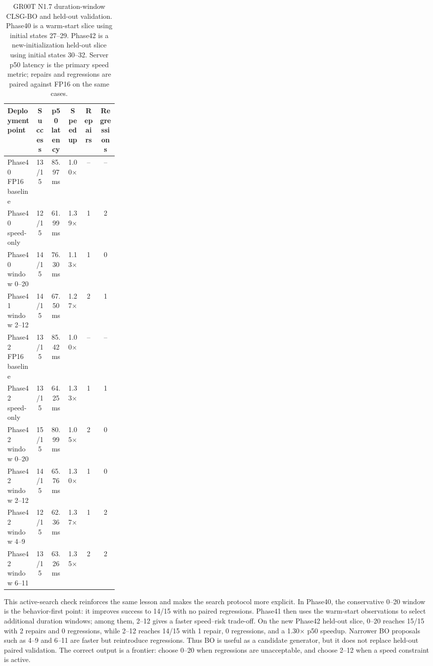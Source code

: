 \documentclass[10pt]{article}
\begin{document}
\begin{table}[H]
\centering
\scriptsize
\setlength{\tabcolsep}{3pt}
\caption{GR00T N1.7 duration-window CLSG-BO and held-out validation. Phase40 is a warm-start slice using initial states 27--29. Phase42 is a new-initialization held-out slice using initial states 30--32. Server p50 latency is the primary speed metric; repairs and regressions are paired against FP16 on the same cases.}
\label{tab:n17-clsg-bo}
\begin{tabular}{p{0.26\linewidth}ccccc}
\toprule
Deployment point & Success & p50 latency & Speedup & Repairs & Regressions \\
\midrule
Phase40 FP16 baseline & 13/15 & 85.97 ms & 1.00$\times$ & -- & -- \\
Phase40 speed-only & 12/15 & 61.99 ms & 1.39$\times$ & 1 & 2 \\
Phase40 window 0--20 & 14/15 & 76.30 ms & 1.13$\times$ & 1 & 0 \\
Phase41 window 2--12 & 14/15 & 67.50 ms & 1.27$\times$ & 2 & 1 \\
\midrule
Phase42 FP16 baseline & 13/15 & 85.42 ms & 1.00$\times$ & -- & -- \\
Phase42 speed-only & 13/15 & 64.25 ms & 1.33$\times$ & 1 & 1 \\
Phase42 window 0--20 & 15/15 & 80.99 ms & 1.05$\times$ & 2 & 0 \\
Phase42 window 2--12 & 14/15 & 65.76 ms & 1.30$\times$ & 1 & 0 \\
Phase42 window 4--9 & 12/15 & 62.36 ms & 1.37$\times$ & 1 & 2 \\
Phase42 window 6--11 & 13/15 & 63.26 ms & 1.35$\times$ & 2 & 2 \\
\bottomrule
\end{tabular}
\end{table}

This active-search check reinforces the same lesson and makes the search protocol more explicit. In Phase40, the conservative 0--20 window is the behavior-first point: it improves success to 14/15 with no paired regressions. Phase41 then uses the warm-start observations to select additional duration windows; among them, 2--12 gives a faster speed--risk trade-off. On the new Phase42 held-out slice, 0--20 reaches 15/15 with 2 repairs and 0 regressions, while 2--12 reaches 14/15 with 1 repair, 0 regressions, and a 1.30$\times$ p50 speedup. Narrower BO proposals such as 4--9 and 6--11 are faster but reintroduce regressions. Thus BO is useful as a candidate generator, but it does not replace held-out paired validation. The correct output is a frontier: choose 0--20 when regressions are unacceptable, and choose 2--12 when a speed constraint is active.
\end{document}
